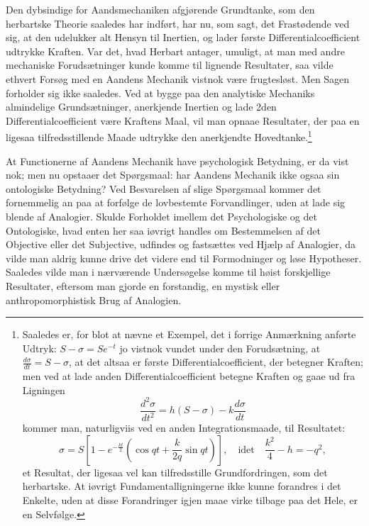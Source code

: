 \documentclass[12pt]{book}
\newcommand{\opage}[1]{\marginnote{\footnotesize\textit{[#1]}}}
\begin{document}
Den dybsindige for Aandsmechaniken afgjørende Grundtanke, som den herbartske Theorie saaledes har
indført, har nu, som sagt, det Frastødende ved sig, at den udelukker alt Hensyn til Inertien, og
lader første Differentialcoefficient udtrykke Kraften. Var det, hvad Herbart antager, umuligt, at man
med andre mechaniske Forudsætninger kunde komme til lignende Resultater, saa vilde ethvert Forsøg med
en Aandens Mechanik vistnok være frugtesløst. Men Sagen forholder sig ikke saaledes. Ved at bygge paa
den analytiske Mechaniks almindelige Grundsætninger, anerkjende Inertien og lade 2den
Differentialcoefficient være Kraftens Maal, vil man opnaae Resultater, der paa en ligesaa
tilfredsstillende Maade udtrykke den anerkjendte Hovedtanke.\footnote{Saaledes er, for blot at nævne
et Exempel, det i forrige Anmærkning anførte Udtryk: $S - \sigma = Se^{-t}$ jo vistnok vundet under
den Forudsætning, at $\frac{d\sigma}{dt} = S - \sigma$, at det altsaa er første
Differentialcoefficient, der betegner Kraften; men ved at lade anden Differentialcoefficient betegne
Kraften og gaae ud fra Ligningen
\[ \frac{d^{2}\sigma}{dt^{2}} = h(S - \sigma) - k\frac{d\sigma}{dt} \]
\opage{423} kommer man, naturligviis ved en anden Integrationsmaade, til Resultatet:
\[ \sigma = S\left[1 - e^{-\frac{kt}{2}}\left(\cos qt + \frac{k}{2q}\sin qt\right)\right], \quad\text{idet}\quad \frac{k^{2}}{4} - h = -q^{2}, \]
et Resultat, der ligesaa vel kan tilfredsstille Grundfordringen, som det herbartske. At iøvrigt
Fundamentalligningerne ikke kunne forandres i det Enkelte, uden at disse Forandringer igjen maae
virke tilbage paa det Hele, er en Selvfølge.}

At Functionerne af Aandens Mechanik have psychologisk Betydning, er da vist nok; men nu opstaaer det
Spørgsmaal: har Aandens Mechanik ikke ogsaa sin ontologiske Betydning? Ved Besvarelsen af slige
Spørgsmaal kommer det fornemmelig an paa at forfølge de lovbestemte Forvandlinger, uden at lade sig
blende af Analogier. Skulde Forholdet imellem det Psychologiske og det Ontologiske, hvad enten her
saa iøvrigt handles om Bestemmelsen af det Objective eller det Subjective, udfindes og fastsættes ved
Hjælp af Analogier, da vilde man aldrig kunne drive det videre end til Formodninger og løse
Hypotheser. Saaledes vilde man i nærværende Undersøgelse komme til høist forskjellige Resultater,
eftersom man gjorde en forstandig, en mystisk eller anthropomorphistisk Brug af Analogien.
\end{document}
